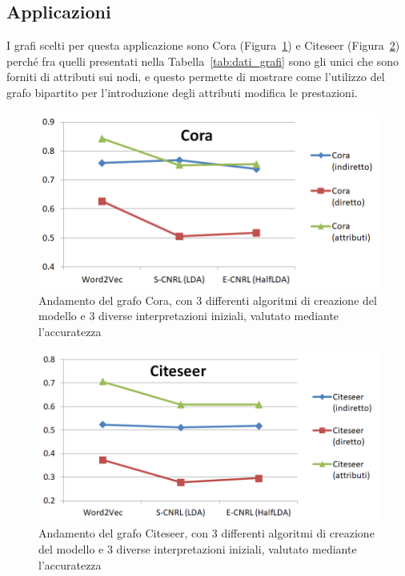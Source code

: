 \subsection{Applicazioni}
I grafi scelti per questa applicazione sono Cora (Figura~\ref{fig:VC_cora}) e Citeseer (Figura~\ref{fig:VC_citeseer}) perché fra quelli presentati nella Tabella~\ref{tab:dati_grafi} sono gli unici che sono forniti di attributi sui nodi, e questo permette di mostrare come l'utilizzo del grafo bipartito per l'introduzione degli attributi modifica le prestazioni.
%
\begin{figure}[htp]
	\centering
	\includegraphics[width=\linewidth]{immagini/VC_cora}
	\caption{Andamento del grafo Cora, con 3 differenti algoritmi di creazione del modello e 3 diverse interpretazioni iniziali, valutato mediante l'accuratezza}
	\label{fig:VC_cora}
\end{figure}
%
\begin{figure}[htp]
	\centering
	\includegraphics[width=\linewidth]{immagini/VC_citeseer}
	\caption{Andamento del grafo Citeseer, con 3 differenti algoritmi di creazione del modello e 3 diverse interpretazioni iniziali, valutato mediante l'accuratezza}
	\label{fig:VC_citeseer}
\end{figure}

